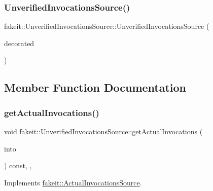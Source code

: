 \subsubsection{\texorpdfstring{UnverifiedInvocationsSource()}{UnverifiedInvocationsSource()}\hspace{0.1cm}{\footnotesize\ttfamily [9/9]}}
{\footnotesize\ttfamily fakeit\+::\+Unverified\+Invocations\+Source\+::\+Unverified\+Invocations\+Source (\begin{DoxyParamCaption}\item[{\mbox{\hyperlink{structfakeit_1_1InvocationsSourceProxy}{Invocations\+Source\+Proxy}}}]{decorated }\end{DoxyParamCaption})\hspace{0.3cm}{\ttfamily [inline]}}



\subsection{Member Function Documentation}
\mbox{\label{structfakeit_1_1UnverifiedInvocationsSource_a889468fefa500d0f7f524f8235a67b0c}} 
\subsubsection{\texorpdfstring{getActualInvocations()}{getActualInvocations()}\hspace{0.1cm}{\footnotesize\ttfamily [1/9]}}
{\footnotesize\ttfamily void fakeit\+::\+Unverified\+Invocations\+Source\+::get\+Actual\+Invocations (\begin{DoxyParamCaption}\item[{std\+::unordered\+\_\+set$<$ \mbox{\hyperlink{structfakeit_1_1Invocation}{fakeit\+::\+Invocation}} $\ast$ $>$ \&}]{into }\end{DoxyParamCaption}) const\hspace{0.3cm}{\ttfamily [inline]}, {\ttfamily [override]}, {\ttfamily [virtual]}}



Implements \mbox{\hyperlink{structfakeit_1_1ActualInvocationsSource_a274de522e11e1f9b8d70c6e0be9e5a9b}{fakeit\+::\+Actual\+Invocations\+Source}}.

